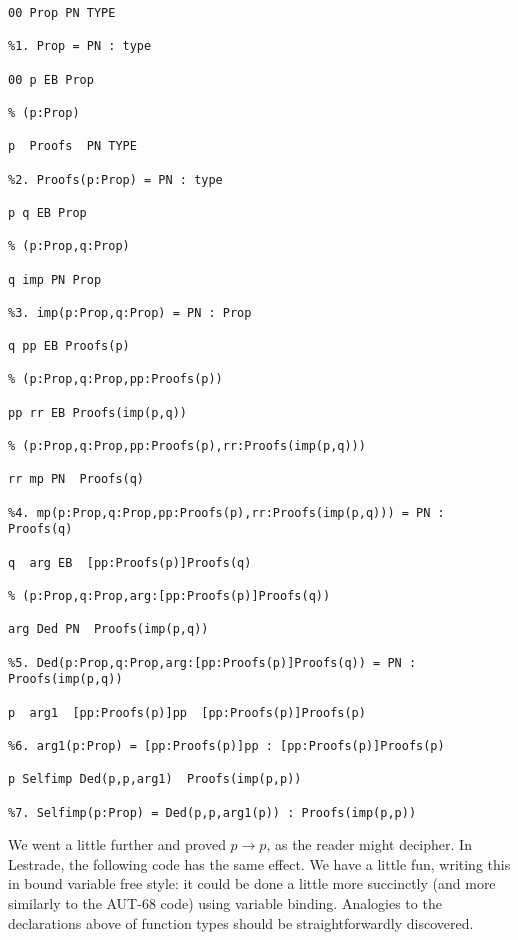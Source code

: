 \documentclass{article}
\begin{document}
   \begin{verbatim}
00 Prop PN TYPE

%1. Prop = PN : type

00 p EB Prop

% (p:Prop)

p  Proofs  PN TYPE

%2. Proofs(p:Prop) = PN : type

p q EB Prop

% (p:Prop,q:Prop)

q imp PN Prop

%3. imp(p:Prop,q:Prop) = PN : Prop

q pp EB Proofs(p)

% (p:Prop,q:Prop,pp:Proofs(p))

pp rr EB Proofs(imp(p,q))

% (p:Prop,q:Prop,pp:Proofs(p),rr:Proofs(imp(p,q)))

rr mp PN  Proofs(q)

%4. mp(p:Prop,q:Prop,pp:Proofs(p),rr:Proofs(imp(p,q))) = PN : Proofs(q)

q  arg EB  [pp:Proofs(p)]Proofs(q)

% (p:Prop,q:Prop,arg:[pp:Proofs(p)]Proofs(q))

arg Ded PN  Proofs(imp(p,q))

%5. Ded(p:Prop,q:Prop,arg:[pp:Proofs(p)]Proofs(q)) = PN : Proofs(imp(p,q))

p  arg1  [pp:Proofs(p)]pp  [pp:Proofs(p)]Proofs(p)

%6. arg1(p:Prop) = [pp:Proofs(p)]pp : [pp:Proofs(p)]Proofs(p)

p Selfimp Ded(p,p,arg1)  Proofs(imp(p,p))

%7. Selfimp(p:Prop) = Ded(p,p,arg1(p)) : Proofs(imp(p,p))
\end{verbatim}

We went a little further and proved $p \rightarrow p$, as the reader might decipher.  In Lestrade, the following code has the same effect.  We have a little fun, writing this in bound variable free style:  it could be done a little more succinctly (and more similarly to the AUT-68 code) using variable binding.  Analogies to the declarations above of function types should be straightforwardly discovered.
\end{document}
